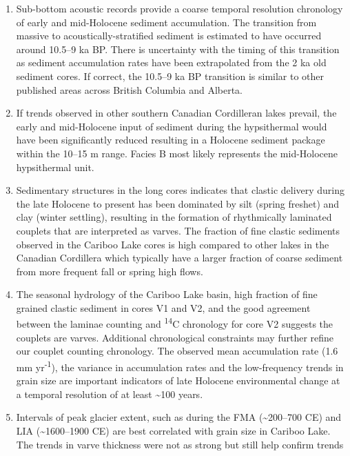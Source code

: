 \documentclass[
  letterpaper,
  DIV=11,
  numbers=noendperiod]{scrartcl}
\providecommand{\tightlist}{%
  \setlength{\itemsep}{0pt}\setlength{\parskip}{0pt}}\usepackage{longtable,booktabs,array}
\begin{document}
\begin{enumerate}
\def\labelenumi{\arabic{enumi}.}
\tightlist
\item
  Sub-bottom acoustic records provide a coarse temporal resolution
  chronology of early and mid-Holocene sediment accumulation. The
  transition from massive to acoustically-stratified sediment is
  estimated to have occurred around 10.5--9 ka BP. There is uncertainty
  with the timing of this transition as sediment accumulation rates have
  been extrapolated from the 2 ka old sediment cores. If correct, the
  10.5--9 ka BP transition is similar to other published areas across
  British Columbia and Alberta.
\item
  If trends observed in other southern Canadian Cordilleran lakes
  prevail, the early and mid-Holocene input of sediment during the
  hypsithermal would have been significantly reduced resulting in a
  Holocene sediment package within the 10--15 m range. Facies B most
  likely represents the mid-Holocene hypsithermal unit.
\item
  Sedimentary structures in the long cores indicates that clastic
  delivery during the late Holocene to present has been dominated by
  silt (spring freshet) and clay (winter settling), resulting in the
  formation of rhythmically laminated couplets that are interpreted as
  varves. The fraction of fine clastic sediments observed in the Cariboo
  Lake cores is high compared to other lakes in the Canadian Cordillera
  which typically have a larger fraction of coarse sediment from more
  frequent fall or spring high flows.
\item
  The seasonal hydrology of the Cariboo Lake basin, high fraction of
  fine grained clastic sediment in cores V1 and V2, and the good
  agreement between the laminae counting and \textsuperscript{14}C
  chronology for core V2 suggests the couplets are varves. Additional
  chronological constraints may further refine our couplet counting
  chronology. The observed mean accumulation rate (1.6 mm
  yr\textsuperscript{-1}), the variance in accumulation rates and the
  low-frequency trends in grain size are important indicators of late
  Holocene environmental change at a temporal resolution of at least
  \textasciitilde100 years.
\item
  Intervals of peak glacier extent, such as during the FMA
  (\textasciitilde200--700 CE) and LIA (\textasciitilde1600--1900 CE)
  are best correlated with grain size in Cariboo Lake. The trends in
  varve thickness were not as strong but still help confirm trends

\end{enumerate}
\end{document}
